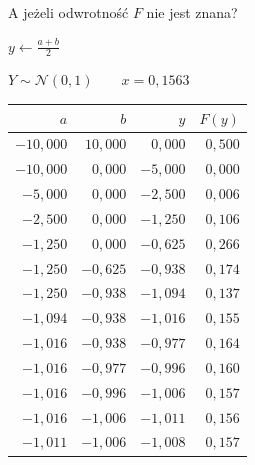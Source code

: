 \documentclass{mp}
\begin{document}
\begin{frame}{A jeżeli odwrotność $F$ nie jest znana?}
\begin{minipage}{.49\textwidth}
\begin{algorithm}[H]
{
$y\leftarrow \frac{a+b}{2}$ \;
}
\end{algorithm}
\end{minipage}
\begin{minipage}{.49\textwidth}
\pause
$Y\sim\mathcal{N}(0,1) \qquad x=0{,}1563$ \\
\pause
\begin{tabular}{rrrr}
	$a$	& $b$	& $y$ &	$F(y)$ \\
	\hline
$-10{,}000$	& $10{,}000$ &	$ 0{,}000$ & $0{,}500$ \\
\pause
$-10{,}000$	& \alert{$ 0{,}000$} &	$-5{,}000$ & $0{,}000$ \\
\alert{$ -5{,}000$}	& $ 0{,}000$ &	$-2{,}500$ & $0{,}006$ \\
\alert{$ -2{,}500$}	& $ 0{,}000$ &	$-1{,}250$ & $0{,}106$ \\
\alert{$ -1{,}250$}	& $ 0{,}000$ &	$-0{,}625$ & $0{,}266$ \\
$ -1{,}250$	& \alert{$-0{,}625$} &	$-0{,}938$ & $0{,}174$ \\
$ -1{,}250$	& \alert{$-0{,}938$} &	$-1{,}094$ & $0{,}137$ \\
\alert{$ -1{,}094$}	& $-0{,}938$ &	$-1{,}016$ & $0{,}155$ \\
\alert{$ -1{,}016$}	& $-0{,}938$ &	$-0{,}977$ & $0{,}164$ \\
$ -1{,}016$	& \alert{$-0{,}977$} &	$-0{,}996$ & $0{,}160$ \\
$ -1{,}016$	& \alert{$-0{,}996$} &	$-1{,}006$ & $0{,}157$ \\
$ -1{,}016$	& \alert{$-1{,}006$} &	$-1{,}011$ & $0{,}156$ \\
\alert{$ -1{,}011$}	& $-1{,}006$ &	$-1{,}008$ & $0{,}157$ \\
\end{tabular}
\end{minipage}
\end{frame}
\end{document}

